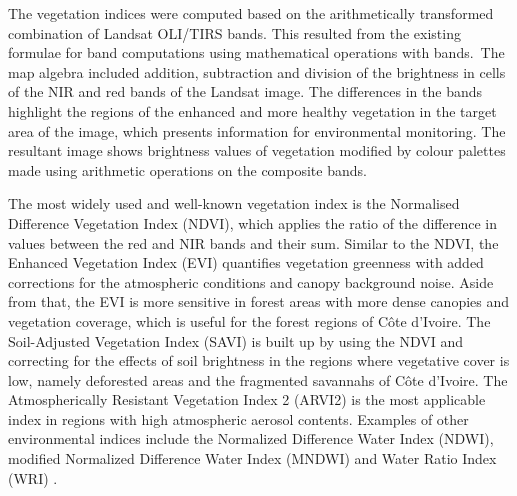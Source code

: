 \documentclass[jimaging,article,accept,pdftex,moreauthors]{Definitions/mdpi}
\begin{document}
The vegetation indices were computed based on the arithmetically transformed combination of Landsat OLI/TIRS bands. This resulted from the existing formulae for band computations using mathematical operations {with bands.~The }map algebra included{ }addition, subtraction and division of the brightness{ in cells }of the NIR and red bands of the Landsat image. The differences in the bands highlight the regions of the enhanced and more healthy vegetation in the target area of the image, which {presents information} for environmental monitoring{.} The resultant image shows{ }brightness values of vegetation modified by colour palettes made using arithmetic operations on the composite bands. 

The most widely used and well-known vegetation index is the Normalised Difference Vegetation Index (NDVI), which applies the ratio of the difference in values between {the} red and NIR bands and their sum. Similar to the{ }NDVI, {the} Enhanced Vegetation Index (EVI) quantifies vegetation greenness with added corrections for the atmospheric conditions and canopy background noise. Aside from that, the EVI is more sensitive in{ }forest areas with{ }more dense canopies and vegetation coverage,{ }which is useful for{ }the forest regions of Côte d'Ivoire. The Soil-Adjusted Vegetation Index (SAVI) is built up by using the NDVI and {correcting for} the effects of soil brightness in the regions where vegetative cover is low{, namely }deforested areas{ }and the fragmented savannahs of Côte d'Ivoire. The Atmospherically Resistant Vegetation Index 2 (ARVI2) is the most applicable index in regions with high atmospheric aerosol contents. Examples of other environmental indices include{ }the Normalized Difference Water Index (NDWI), modified Normalized Difference Water Index (MNDWI) and Water Ratio Index (WRI) \cite{s22186827}.
\end{document}
